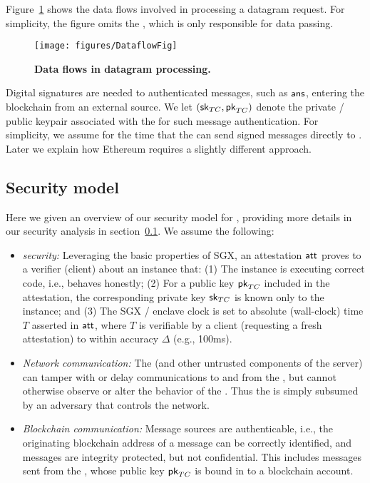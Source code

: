 Figure~\ref{fig:dataflow} shows the data flows involved in processing a datagram request. For simplicity, the figure omits the \medname, which is only responsible for data passing.


\begin{figure}[h!]
\centering
\texttt{[image: figures/DataflowFig]}
\caption{{\bf Data flows in datagram processing.}}
\label{fig:dataflow}
\end{figure}


Digital signatures are needed to authenticated messages, such as ${\sf ans}$, entering the blockchain from an external source. We let $({{\sf sk}_{TC}}, {\sf pk}_{TC})$ denote the private / public keypair associated with the \encname for such message authentication. For simplicity, we assume for the time that the \encname can send signed messages directly to \tcont. Later we explain how Ethereum requires a slightly different approach.

\subsection{Security model}

Here we given an overview of our security model for \tc, providing more details in our security analysis in section~\ref{}. We assume the following:

\begin{itemize}
\item {\em \encname security:} Leveraging the basic properties of SGX, an attestation ${\sf att}$ proves to a verifier (client) about an \encname instance that: (1) The instance is executing correct code, i.e., behaves honestly; (2) For a public key ${\sf pk}_{TC}$ included in the attestation, the corresponding private key ${{\sf sk}_{TC}}$ is known only to the instance; and (3) The SGX / enclave clock is set to absolute (wall-clock) time $T$ asserted in ${\sf att}$, where $T$ is verifiable by a client (requesting a fresh attestation) to within accuracy $\Delta$ (e.g., 100ms).

\item {\em Network communication:} The \medname (and other untrusted components of the \tc server) can tamper with or delay communications to and from the \encname, but cannot otherwise observe or alter the behavior of the \encname. Thus the \medname is simply subsumed by an adversary that controls the network. 

\item {\em Blockchain communication:} Message sources are authenticable, i.e., the originating blockchain address of a message can be correctly identified, and messages are integrity protected, but not confidential. This includes messages sent from the \encname, whose public key ${\sf pk}_{TC}$ is bound in \tc to a blockchain account. 
\end{itemize}

